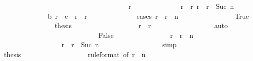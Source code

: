 \begin{isabellebody}
\ \ \ \ \ \ \ \ \ \ \ \ \isamarkupfalse%
\isanewline
\ \ \ \ \ \ \ \ \ \ \isamarkupfalse%
\isanewline
\ \ \ \ \ \ \ \ \ \ \ \ \isamarkupfalse%
\ r\isanewline
\ \ \ \ \ \ \ \ \ \ \ \ \isamarkupfalse%
\ {\isachardoublequoteopen}r{}\ {\isacharless}\ r{\isachardoublequoteclose}\ {\isachardoublequoteopen}r\ {\isacharless}\ r{}\ {\isacharplus}\ Suc\ n{\isachardoublequoteclose}\isanewline
\ \ \ \ \ \ \ \ \ \ \ \ \isamarkupfalse%
\ {\isachardoublequoteopen}{\isacharquery}b\ r\ {\isasymle}\ c{}\ {\isacharplus}\ {\isacharparenleft}r\ {\isacharminus}\ r{}{\isacharparenright}{\isachardoublequoteclose}\isanewline
\ \ \ \ \ \ \ \ \ \ \ \ \isamarkupfalse%
\ {\isacharparenleft}cases\ {\isachardoublequoteopen}r\ {\isacharless}\ r{}\ {\isacharplus}\ n{\isachardoublequoteclose}{\isacharparenright}\isanewline
\ \ \ \ \ \ \ \ \ \ \ \ \ \ \isamarkupfalse%
\ True\isanewline
\ \ \ \ \ \ \ \ \ \ \ \ \ \ \isamarkupfalse%
\ {\isacharquery}thesis\isanewline
\ \ \ \ \ \ \ \ \ \ \ \ \ \ \ \ \isamarkupfalse%
\ {\isacharasterisk}\ {\isacharbackquoteopen}r{}\ {\isacharless}\ r{\isacharbackquoteclose}\isanewline
\ \ \ \ \ \ \ \ \ \ \ \ \ \ \ \ \isamarkupfalse%
\ auto\isanewline
\ \ \ \ \ \ \ \ \ \ \ \ \isamarkupfalse%
\isanewline
\ \ \ \ \ \ \ \ \ \ \ \ \ \ \isamarkupfalse%
\ False\isanewline
\ \ \ \ \ \ \ \ \ \ \ \ \ \ \isamarkupfalse%
\ {\isachardoublequoteopen}r\ {\isacharequal}\ r{}\ {\isacharplus}\ n{\isachardoublequoteclose}\isanewline
\ \ \ \ \ \ \ \ \ \ \ \ \ \ \ \ \isamarkupfalse%
\ {\isacharbackquoteopen}r\ {\isacharless}\ r{}\ {\isacharplus}\ Suc\ n{\isacharbackquoteclose}\isanewline
\ \ \ \ \ \ \ \ \ \ \ \ \ \ \ \ \isamarkupfalse%
\ simp\isanewline
\ \ \ \ \ \ \ \ \ \ \ \ \ \ \isamarkupfalse%
\ {\isacharquery}thesis\isanewline
\ \ \ \ \ \ \ \ \ \ \ \ \ \ \ \ \isamarkupfalse%
\ {\isacharasterisk}{\isacharparenleft}{}{\isacharparenright}\ {\isacharasterisk}{\isacharparenleft}{}{\isacharparenright}{\isacharbrackleft}rule{\isacharunderscore}format{\isacharcomma}\ of\ {\isachardoublequoteopen}r{}\ {\isacharplus}\ n\ {\isacharminus}\ {}{\isachardoublequoteclose}{\isacharbrackright}\isanewline
\ \ \ \ \ \ \ \ \ \ \ \ \ \ \ \ \isamarkupfalse%

\end{isabellebody}
